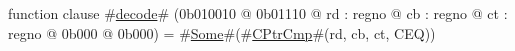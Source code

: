 function clause #\hyperref[zdecode]{decode}# (0b010010 @ 0b01110 @ rd : regno @ cb : regno @ ct : regno @ 0b000 @ 0b000) = #\hyperref[zSome]{Some}#(#\hyperref[zCPtrCmp]{CPtrCmp}#(rd, cb, ct, CEQ))

